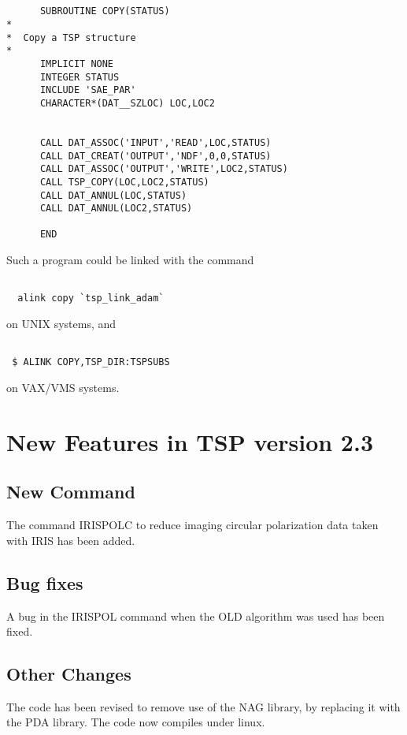 \documentclass[11pt,twoside]{article}
\renewcommand{\_}{\texttt{\symbol{95}}}
\begin{document}
\begin{verbatim}


      SUBROUTINE COPY(STATUS)
*
*  Copy a TSP structure
*
      IMPLICIT NONE
      INTEGER STATUS
      INCLUDE 'SAE_PAR'
      CHARACTER*(DAT__SZLOC) LOC,LOC2


      CALL DAT_ASSOC('INPUT','READ',LOC,STATUS)
      CALL DAT_CREAT('OUTPUT','NDF',0,0,STATUS)
      CALL DAT_ASSOC('OUTPUT','WRITE',LOC2,STATUS)
      CALL TSP_COPY(LOC,LOC2,STATUS)
      CALL DAT_ANNUL(LOC,STATUS)
      CALL DAT_ANNUL(LOC2,STATUS)

      END

\end{verbatim}

Such a program could be linked with the command

\begin{verbatim}

  alink copy `tsp_link_adam`
\end{verbatim}
on UNIX systems, and


\begin{verbatim}

 $ ALINK COPY,TSP_DIR:TSPSUBS

\end{verbatim}
on VAX/VMS systems.

\section{New Features in TSP version 2.3}

\subsection{New Command}

The command IRISPOLC to reduce imaging circular polarization data taken with
IRIS has been added.

\subsection{Bug fixes}

A bug in the IRISPOL command when the OLD algorithm was used has been fixed.

\subsection{Other Changes}

The code has been revised to remove use of the NAG library, by replacing it
with the PDA library. The code now compiles under linux.
\end{document}
